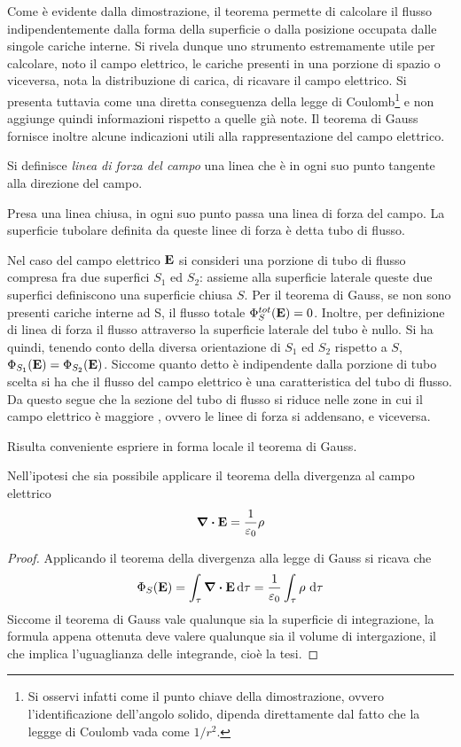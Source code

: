 Come è evidente dalla dimostrazione, il teorema permette di calcolare il flusso indipendentemente dalla forma della superficie o
dalla posizione occupata dalle singole cariche interne. Si rivela dunque uno strumento estremamente utile per calcolare, noto
il campo elettrico, le cariche presenti in una porzione di spazio o viceversa, nota la distribuzione di carica, di
ricavare il campo elettrico. Si presenta tuttavia come una diretta conseguenza della legge di Coulomb\footnote{Si
osservi infatti come il punto chiave della dimostrazione, ovvero l'identificazione dell'angolo solido, dipenda direttamente dal
fatto che la leggge di Coulomb vada come $1/r^2$.} e non aggiunge quindi informazioni rispetto a quelle già note.
Il teorema di Gauss fornisce inoltre alcune indicazioni utili alla rappresentazione del campo elettrico.
\begin{defn}
    Si definisce \textit{linea di forza del campo} una linea che è in ogni suo punto tangente alla direzione del campo.
\end{defn}
\begin{defn}
    Presa una linea chiusa, in ogni suo punto passa una linea di forza del campo. La superficie tubolare definita da queste
    linee di forza è detta tubo di flusso.
\end{defn}
Nel caso del campo elettrico $\vb{E}$ si consideri una porzione di tubo di flusso compresa fra due superfici $S_1$
ed $S_2$: assieme alla superficie laterale queste due superfici definiscono una superficie chiusa $S$. Per il teorema di Gauss,
se non sono presenti cariche interne ad S, il flusso totale $\Phi_S^{tot}(\vb{E})=0$. Inoltre, per definizione di linea
di forza il flusso attraverso la superficie laterale del tubo è nullo.
Si ha quindi, tenendo conto della diversa orientazione di $S_1$ ed $S_2$ rispetto a $S$, $\Phi_{S_1}(\vb{E})=\Phi_{S_2}(\vb{E})$.
Siccome quanto detto è indipendente dalla porzione di tubo scelta si ha che il flusso del campo elettrico è una caratteristica del
tubo di flusso. Da questo segue che la sezione del tubo di flusso si riduce nelle zone in cui il campo elettrico è maggiore
, ovvero le linee di forza si addensano, e viceversa.

Risulta conveniente espriere in forma locale il teorema di Gauss.
\begin{cor}
    Nell'ipotesi che sia possibile applicare il teorema della divergenza al campo elettrico
    \begin{equation}
        \label{eqn:prima_maxwell}
        \div{\vb{E}}=\frac{1}{\varepsilon_0}\rho
    \end{equation}
\end{cor}
\begin{proof}
Applicando il teorema della divergenza alla legge di Gauss si ricava che
\[
    \Phi_S(\vb{E})=\int_\tau \div{\vb{E}} \dd{\tau}=\frac{1}{\varepsilon_0}\int_\tau \rho\, \dd{\tau}
\]
Siccome il teorema di Gauss vale qualunque sia la superficie di integrazione, la formula appena ottenuta deve valere qualunque sia
il volume di intergazione, il che implica l'uguaglianza delle integrande, cioè la tesi.
\end{proof}

